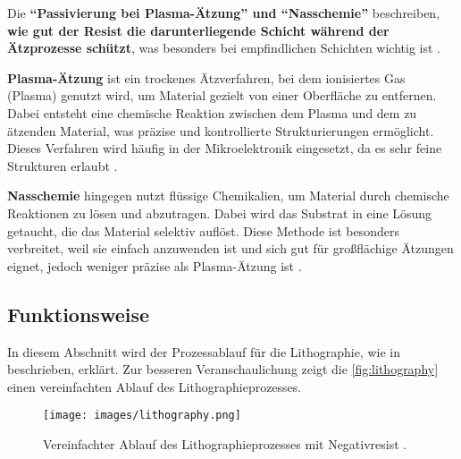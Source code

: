 \documentclass{article} %
\begin{document}
\vspace{1em}

Die \textbf{``Passivierung bei Plasma-Ätzung'' und ``Nasschemie''} beschreiben, \textbf{wie gut der Resist die darunterliegende Schicht während der Ätzprozesse schützt}, was besonders bei empfindlichen Schichten wichtig ist \cite{schmid2024}. 

\vspace{1em}

\textbf{Plasma-Ätzung} ist ein trockenes Ätzverfahren, bei dem ionisiertes Gas (Plasma) genutzt wird, um Material gezielt von einer Oberfläche zu entfernen. Dabei entsteht eine chemische Reaktion zwischen dem Plasma und dem zu ätzenden Material, was präzise und kontrollierte Strukturierungen ermöglicht. Dieses Verfahren wird häufig in der Mikroelektronik eingesetzt, da es sehr feine Strukturen erlaubt \cite{madou2002, wolf2000}.

\vspace{1em}

\textbf{Nasschemie} hingegen nutzt flüssige Chemikalien, um Material durch chemische Reaktionen zu lösen und abzutragen. Dabei wird das Substrat in eine Lösung getaucht, die das Material selektiv auflöst. Diese Methode ist besonders verbreitet, weil sie einfach anzuwenden ist und sich gut für großflächige Ätzungen eignet, jedoch weniger präzise als Plasma-Ätzung ist \cite{rogers2008, gerald2006}.





\vspace{1em}

\subsection{Funktionsweise}

In diesem Abschnitt wird der Prozessablauf für die Lithographie, wie in \cite{schmid2024, gerald2006} beschrieben, erklärt. Zur besseren Veranschaulichung zeigt die \autoref{fig:lithography} einen vereinfachten Ablauf des Lithographieprozesses.

\begin{figure}[htb!]
    \centering
    \texttt{[image: images/lithography.png]} %
    \captionsetup{labelfont=bf, width=\textwidth} %
    \caption{Vereinfachter Ablauf des Lithographieprozesses mit Negativresist \cite{wias_photoresist}.}
    \label{fig:lithography}
\end{figure}
\end{document}

